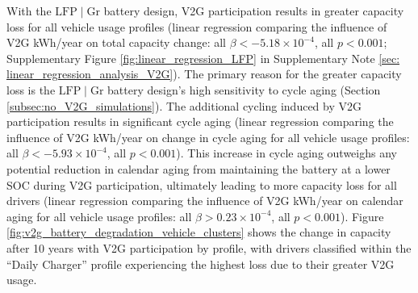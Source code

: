\documentclass[pdflatex,sn-nature]{sn-jnl}%
\theoremstyle{thmstyleone}%
\theoremstyle{thmstyletwo}%
\theoremstyle{thmstylethree}%
\begin{document}
With the $\mathrm{LFP}\mid\mathrm{Gr}$ battery design, V2G participation results in greater capacity loss for all vehicle usage profiles (linear regression comparing the influence of V2G kWh/year on total capacity change: all $\beta < -5.18 \times 10^{-4}$, all $p < 0.001$; Supplementary Figure \ref{fig:linear_regression_LFP} in Supplementary Note \ref{sec: linear_regression_analysis_V2G}). The primary reason for the greater capacity loss is the $\mathrm{LFP}\mid\mathrm{Gr}$ battery design’s high sensitivity to cycle aging (Section \ref{subsec:no_V2G_simulations}). The additional cycling induced by V2G participation results in significant cycle aging (linear regression comparing the influence of V2G kWh/year on change in cycle aging for all vehicle usage profiles: all $\beta < -5.93 \times 10^{-4}$, all $p < 0.001$). This increase in cycle aging outweighs any potential reduction in calendar aging from maintaining the battery at a lower SOC during V2G participation, ultimately leading to more capacity loss for all drivers (linear regression comparing the influence of V2G kWh/year on calendar aging for all vehicle usage profiles: all $\beta > 0.23 \times 10^{-4}$, all $p < 0.001$). Figure \ref{fig:v2g_battery_degradation_vehicle_clusters} shows the change in capacity after 10 years with V2G participation by profile, with drivers classified within the ``Daily Charger'' profile experiencing the highest loss due to their greater V2G usage.
\end{document}
